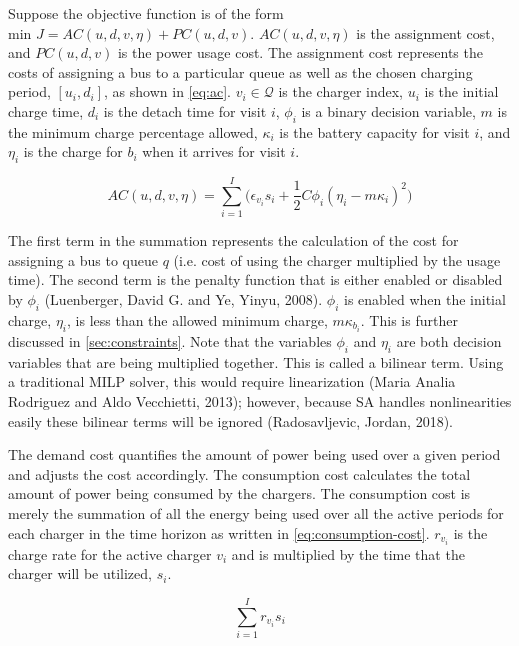 \documentclass[11pt,a4paper,final]{article}
\newcommand{\AC}{AC(u, d, v, \eta)}         %
\newcommand{\PC}{PC(u, d, v)}               %
\newcommand{\Qset}{\mathcal{Q}}             %
\begin{document}
Suppose the objective function is of the form \(\text{min } J = \AC + \PC\). \(\AC\) is the assignment cost, and \(\PC\) is
the power usage cost. The assignment cost represents the costs of assigning a bus to a particular queue as well as the
chosen charging period, \([u_i, d_i]\), as shown in \ref{eq:ac}. \(v_i \in \Qset\) is the charger index, \(u_i\) is the initial
charge time, \(d_i\) is the detach time for visit \(i\), \(\phi_i\) is a binary decision variable, \(m\) is the minimum charge
percentage allowed, \(\kappa_i\) is the battery capacity for visit \(i\), and \(\eta_i\) is the charge for \(b_i\) when it
arrives for visit \(i\).

\begin{equation}
\label{eq:ac}
\AC = \sum_{i=1}^I \Big(\epsilon_{v_i}s_i + \frac{1}{2} C \phi_i (\eta_i - m \kappa_i)^{2}\Big)
\end{equation}

The first term in the summation represents the calculation of the cost for assigning a bus to queue \(q\) (i.e. cost of
using the charger multiplied by the usage time). The second term is the penalty function that is either enabled or
disabled by \(\phi_i\) (Luenberger, David G. and Ye, Yinyu, 2008). \(\phi_i\) is enabled when the initial charge, \(\eta_i\), is less
than the allowed minimum charge, \(m\kappa_{b_i}\). This is further discussed in \ref{sec:constraints}. Note that the variables
\(\phi_i\) and \(\eta_i\) are both decision variables that are being multiplied together. This is called a bilinear term. Using a
traditional MILP solver, this would require linearization (Maria Analia Rodriguez and Aldo Vecchietti, 2013); however, because SA handles
nonlinearities easily these bilinear terms will be ignored (Radosavljevic, Jordan, 2018).

The demand cost quantifies the amount of power being used over a given period and adjusts the cost accordingly. The
consumption cost calculates the total amount of power being consumed by the chargers. The consumption cost is merely the
summation of all the energy being used over all the active periods for each charger in the time horizon as written in
\ref{eq:consumption-cost}. \(r_{v_i}\) is the charge rate for the active charger \(v_i\) and is multiplied by the time that the
charger will be utilized, \(s_i\).

\begin{equation}
\label{eq:consumption-cost}
  \sum_{i=1}^I r_{v_i}s_i
\end{equation}
\end{document}
